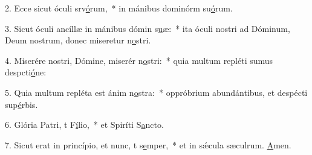 2. Ecce sicut óculi srv\uline{ó}rum,~* in mánibus dominórm su\uline{ó}rum.\par 
3. Sicut óculi ancíllæ in mánibus dómin s\uline{u}æ:~* ita óculi nostri ad Dóminum, Deum nostrum, donec miseretur n\uline{o}stri.\par 
4. Miserére nostri, Dómine, miserér n\uline{o}stri:~* quia multum repléti sumus despcti\uline{ó}ne:\par 
5. Quia multum repléta est ánim n\uline{o}stra:~* oppróbrium abundántibus, et despécti sup\uline{é}rbis.\par 
6. Glória Patri, t F\uline{í}lio,~* et Spiríti S\uline{a}ncto.\par 
7. Sicut erat in princípio, et nunc, t s\uline{e}mper,~* et in sǽcula sæculrum. \uline{A}men.\par 
